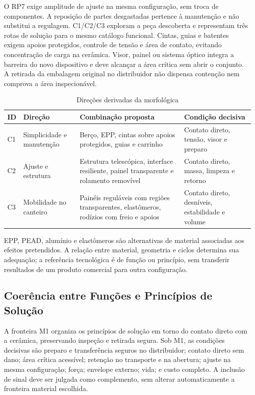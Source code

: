 O RP7 exige amplitude de ajuste na mesma configuração, sem troca de componentes. A reposição de partes desgastadas pertence à manutenção e não substitui a regulagem. C1/C2/C3 exploram a peça descoberta e representam três rotas de solução para o mesmo catálogo funcional. Cintas, guias e batentes exigem apoios protegidos, controle de tensão e área de contato, evitando concentração de carga na cerâmica. Visor, painel ou sistema óptico integra a barreira do novo dispositivo e deve alcançar a área crítica sem abrir o conjunto. A retirada da embalagem original no distribuidor não dispensa contenção nem comprova a área inspecionável.

\begin{table}[H]
\caption{Direções derivadas da morfológica}\centering\footnotesize
\begin{tabularx}{\textwidth}{L{0.9cm}L{3.2cm}YY}
\toprule\textbf{ID}&\textbf{Direção}&\textbf{Combinação proposta}&\textbf{Condição decisiva}\\\midrule
C1&Simplicidade e manutenção&Berço, EPP, cintas sobre apoios protegidos, guias e carrinho&Contato direto, tensão, visor e preparo\\
C2&Ajuste e estrutura&Estrutura telescópica, interface resiliente, painel transparente e rolamento removível&Contato direto, massa, limpeza e retorno\\
C3&Mobilidade no canteiro&Painéis reguláveis com regiões transparentes, elastômeros, rodízios com freio e apoios&Contato direto, desníveis, estabilidade e volume\\
\bottomrule\end{tabularx}
\end{table}

EPP, PEAD, alumínio e elastômeros são alternativas de material associadas aos efeitos pretendidos. A relação entre material, geometria e ciclos determina sua adequação; a referência tecnológica é de função ou princípio, sem transferir resultados de um produto comercial para outra configuração.

\subsection{Coerência entre Funções e Princípios de Solução}

A fronteira M1 organiza os princípios de solução em torno do contato direto com a cerâmica, preservando inspeção e retirada segura. Sob M1, as condições decisivas são preparo e transferência seguros no distribuidor; contato direto sem dano; área crítica acessível; retenção no transporte e na abertura; ajuste na mesma configuração; força; envelope externo; vida; e custo completo. A inclusão de sinal deve ser julgada como complemento, sem alterar automaticamente a fronteira material escolhida.

